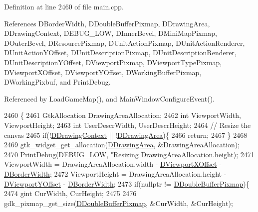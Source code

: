 Definition at line 2460 of file main.\+cpp.



References D\+Border\+Width, D\+Double\+Buffer\+Pixmap, D\+Drawing\+Area, D\+Drawing\+Context, D\+E\+B\+U\+G\+\_\+\+L\+OW, D\+Inner\+Bevel, D\+Mini\+Map\+Pixmap, D\+Outer\+Bevel, D\+Resource\+Pixmap, D\+Unit\+Action\+Pixmap, D\+Unit\+Action\+Renderer, D\+Unit\+Action\+Y\+Offset, D\+Unit\+Description\+Pixmap, D\+Unit\+Description\+Renderer, D\+Unit\+Description\+Y\+Offset, D\+Viewport\+Pixmap, D\+Viewport\+Type\+Pixmap, D\+Viewport\+X\+Offset, D\+Viewport\+Y\+Offset, D\+Working\+Buffer\+Pixmap, D\+Working\+Pixbuf, and Print\+Debug.



Referenced by Load\+Game\+Map(), and Main\+Window\+Configure\+Event().


\begin{DoxyCode}
2460                                      \{
2461     GtkAllocation DrawingAreaAllocation;
2462     \textcolor{keywordtype}{int} ViewportWidth, ViewportHeight;
2463     \textcolor{keywordtype}{int} UserDescrWidth, UserDescrHeight;
2464     \textcolor{comment}{// Resize the canvas}
2465     \textcolor{keywordflow}{if}(!\hyperlink{classCApplicationData_aa6c5bea9bdcc64398e5a3f693661d37c}{DDrawingContext} || !\hyperlink{classCApplicationData_a4735f5d31632313e0b2a1659eb178987}{DDrawingArea})\{
2466         \textcolor{keywordflow}{return};    
2467     \}
2468     
2469     gtk\_widget\_get\_allocation(\hyperlink{classCApplicationData_a4735f5d31632313e0b2a1659eb178987}{DDrawingArea}, &DrawingAreaAllocation);
2470     \hyperlink{Debug_8h_aa5f00f5537c9760f6ae1782460748ab9}{PrintDebug}(\hyperlink{Debug_8h_a3a5f3fc09784650d8388cb854882f840}{DEBUG\_LOW}, \textcolor{stringliteral}{"Resizing %
      DrawingAreaAllocation.height);
2471     ViewportWidth = DrawingAreaAllocation.width - \hyperlink{classCApplicationData_a306bba873ccc47126111305fe21ef3ff}{DViewportXOffset} - 
      \hyperlink{classCApplicationData_a566b69c72fa982c6ecf8e47dc21df489}{DBorderWidth};
2472     ViewportHeight = DrawingAreaAllocation.height - \hyperlink{classCApplicationData_afc58ed96a1af813b28f6abf2c7d2dc72}{DViewportYOffset} - 
      \hyperlink{classCApplicationData_a566b69c72fa982c6ecf8e47dc21df489}{DBorderWidth};
2473     \textcolor{keywordflow}{if}(\textcolor{keyword}{nullptr} != \hyperlink{classCApplicationData_aefb64ec5ca3f791f6d431cfc56b9f3b3}{DDoubleBufferPixmap})\{
2474         gint CurWidth, CurHeight;
2475         
2476         gdk\_pixmap\_get\_size(\hyperlink{classCApplicationData_aefb64ec5ca3f791f6d431cfc56b9f3b3}{DDoubleBufferPixmap}, &CurWidth, &CurHeight); 
}
\end{DoxyCode}
